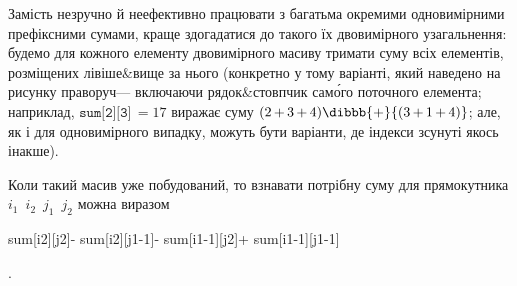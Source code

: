 Замість незруч\-но й неефе\-ктив\-но працювати з багатьма окремими одновимірними префіксними сумами, краще здогадатися до такого їх двовимірного узагальнення: будемо для кожного елементу двовимірного масиву тримати суму всіх елементів, розміщених лівіше\&вище за нього (конкретно у тому варіанті, який наведено на рисунку праворуч\nolinebreak[3] --- включаючи рядок\&стовп\-чик сам\'{о}го поточного елемента; наприклад, $\texttt{sum[2][3]}\,{=}17$ виражає суму ${(2\,{+}\,3\,{+}\,4)}\dibbb{{+}}{(3\,{+}\,1\,{+}\,4)}$; але, як і для одновимірного випадку, можуть бути варіанти, де індекси зсунуті якось інакше).

Коли такий масив уже побудований, то взнавати потрібну суму для прямокутника $i_1$~$i_2$~$j_1$~$j_2$ можна виразом 
\begin{ttfamily}%
sum[i2][j2]\nolinebreak\hspace{0.125em plus 0.125em}-\nolinebreak[2]\hspace{0.125em plus 0.125em}%
sum[i2][j1-1]\nolinebreak\hspace{0.125em plus 0.125em}-\nolinebreak[2]\hspace{0.125em plus 0.125em}%
sum[i1-1][j2]\nolinebreak\hspace{0.125em plus 0.125em}+\nolinebreak[2]\hspace{0.125em plus 0.125em}%
sum[i1-1][j1-1]\end{ttfamily}.

